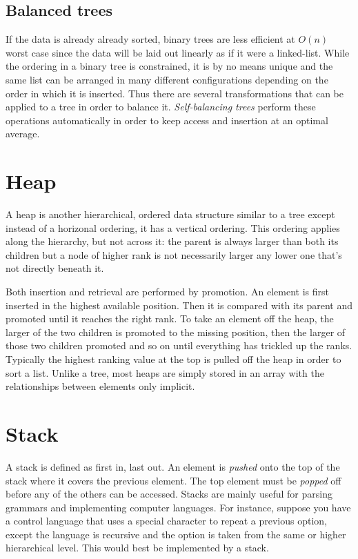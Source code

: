 \documentclass{article}
\begin{document}
\subsection{Balanced trees}

If the data is already already sorted, binary trees are less
efficient at $O(n)$ worst case since the data will be laid out linearly as if 
it were a linked-list.
While the ordering in a binary tree is constrained, it is by no means unique
and the same list can be arranged in many different configurations depending
on the order in which it is inserted.
Thus there are several transformations that can be applied to a tree in order
to balance it.
{\it Self-balancing trees} perform these operations automatically in order to
keep access and insertion at an optimal average.

\section{Heap}

A heap is another hierarchical, ordered data structure similar to a tree except
instead of a horizonal ordering, it has a vertical ordering.
This ordering applies along the hierarchy, but not across it: the parent is
always larger than both its children but a node of higher rank is not 
necessarily larger any lower one that's not directly beneath it.

Both insertion and retrieval are performed by promotion. An element is
first inserted in the highest available position. Then it is compared with
its parent and promoted until it reaches the right rank.
To take an element off the heap, the larger of the two children is promoted
to the missing position, then the larger of those two children promoted and
so on until everything has trickled up the ranks.
Typically the highest ranking value at the top is pulled off the heap in order
to sort a list.
Unlike a tree, most heaps are simply stored in an array with the relationships
between elements only implicit.

\section{Stack}

A stack is defined as first in, last out. An element is {\it pushed} onto the 
top of the stack where it covers the previous element. The top element must be
{\it popped} off before any of the others can be accessed.
Stacks are mainly useful for parsing grammars and implementing computer 
languages. For instance, suppose you have a control language
that uses a special character to repeat
a previous option, except the language is recursive and the option is taken 
from the same or higher hierarchical level. 
This would best be implemented by a stack.
\end{document}

